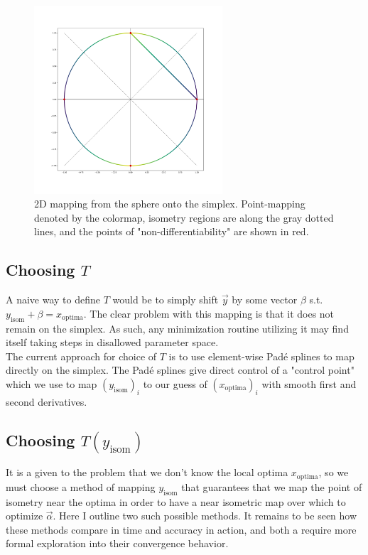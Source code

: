 \documentclass[10pt]{article}
\begin{document}
\begin{figure}[h]
	\centering
	\includegraphics[width=7cm]{simplexParam.pdf}
	\caption{2D mapping from the sphere onto the simplex. Point-mapping denoted by the colormap, isometry regions are along the gray dotted lines, and the points of "non-differentiability" are shown in red.}
\end{figure}


\subsection{Choosing $T$}
A naive way to define $T$ would be to simply shift $\vec{y}$ by some vector $\beta$ s.t. $y_{\text{isom}} + \beta = x_{\text{optima}}$. The clear problem with this mapping is that it does not remain on the simplex. As such, any minimization routine utilizing it may find itself taking steps in disallowed parameter space.\\

The current approach for choice of $T$ is to use element-wise Padé splines to map directly on the simplex. The Padé splines give direct control of a "control point" which we use to map $(y_{\text{isom}})_i$ to our guess of $(x_{\text{optima}})_i$ with smooth first and second derivatives. 


\subsection{Choosing $T(y_\text{isom})$}\label{choosingRemap}

It is a given to the problem that we don't know the local optima $x_{\text{optima}}$, so we must choose a method of mapping $y_{\text{isom}}$ that guarantees that we map the point of isometry near the optima in order to have a near isometric map over which to optimize $\vec{\alpha}$. Here I outline two such possible methods. It remains to be seen how these methods compare in time and accuracy in action, and both a require more formal exploration into their convergence behavior.
\end{document}
